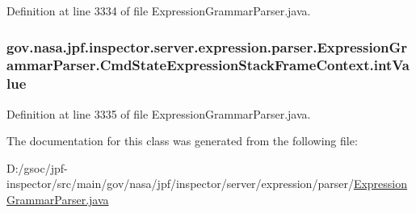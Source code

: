 Definition at line 3334 of file Expression\+Grammar\+Parser.\+java.

\subsubsection[{\texorpdfstring{int\+Value}{intValue}}]{ gov.\+nasa.\+jpf.\+inspector.\+server.\+expression.\+parser.\+Expression\+Grammar\+Parser.\+Cmd\+State\+Expression\+Stack\+Frame\+Context.\+int\+Value}\hypertarget{classgov_1_1nasa_1_1jpf_1_1inspector_1_1server_1_1expression_1_1parser_1_1_expression_grammar_pa1661807291671005dea18d81e1943036_aa29179134b3bf81c47b857c9f26d35c6}{}\label{classgov_1_1nasa_1_1jpf_1_1inspector_1_1server_1_1expression_1_1parser_1_1_expression_grammar_pa1661807291671005dea18d81e1943036_aa29179134b3bf81c47b857c9f26d35c6}


Definition at line 3335 of file Expression\+Grammar\+Parser.\+java.



The documentation for this class was generated from the following file\+:\begin{DoxyCompactItemize}
\item 
D\+:/gsoc/jpf-\/inspector/src/main/gov/nasa/jpf/inspector/server/expression/parser/\hyperlink{_expression_grammar_parser_8java}{Expression\+Grammar\+Parser.\+java}\end{DoxyCompactItemize}
